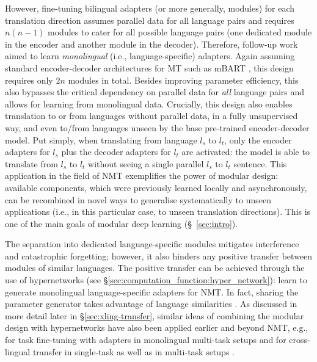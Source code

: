 \documentclass[10pt]{article} %
\begin{document}
However,  
fine-tuning bilingual adapters (or more generally, modules) for each translation direction assumes parallel data for all language pairs and requires $n(n-1)$ modules to cater for all possible language pairs (one dedicated module in the encoder and another module in the decoder). Therefore, follow-up work \citep{philip-etal-2020-monolingual,ustun-etal-2021-multilingual} aimed to learn \textit{monolingual} (i.e., language-specific) adapters. Again assuming standard encoder-decoder architectures for MT such as mBART \citep{liu-etal-2020-multilingual-denoising}, this design requires only $2n$ modules in total. Besides improving parameter efficiency, this also bypasses the critical dependency on parallel data for \textit{all} language pairs and allows for learning from monolingual data. Crucially, this design also enables translation to or from languages without parallel data, in a fully unsupervised way, and even to/from languages unseen by the base pre-trained encoder-decoder model. Put simply, when translating from language $l_{s}$ to $l_{t}$, only the encoder adapters for $l_{s}$ plus the decoder adapters for $l_{t}$ are activated: the model is able to translate from $l_{s}$ to $l_{t}$ without seeing a single parallel $l_{s}$ to $l_{t}$ sentence. This application in the field of NMT exemplifies the power of modular design: available components, which were previously learned locally and asynchronously, can be recombined in novel ways to generalise systematically to unseen applications (i.e., in this particular case, to unseen translation directions). This is one of the main goals of modular deep learning (\S~\ref{sec:intro}). 

The separation into dedicated language-specific modules mitigates interference and catastrophic forgetting; however, it also hinders any positive transfer between modules of similar languages. The positive transfer can be achieved through the use of hypernetworks (see \S\ref{sec:computation_function:hyper_network}): \cite{Baziotis2022MultilingualMTHyperAdapter} learn to generate monolingual language-specific adapters for NMT. In fact, sharing the parameter generator takes advantage of language similarities \citep{platanios-etal-2018-contextual}. As discussed in more detail later in \S\ref{sec:xling-transfer}, similar ideas of combining the modular design with hypernetworks have also been applied earlier and beyond NMT, e.g., for task fine-tuning with adapters in monolingual multi-task setups \citep{mahabadi2021parameter} and for cross-lingual transfer in single-task \citep{Ansell2021MADG} as well as in multi-task setups \citep{ponti-etal-2021-parameter,Ustun:2022hyperx}. 
\end{document}
